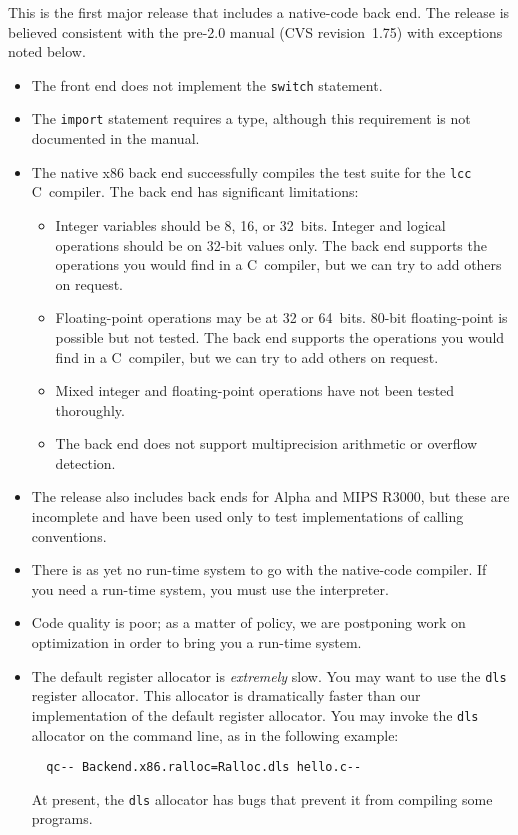 \documentclass{article}
\begin{document}
This is the first major release that includes a native-code back end.
The release is believed consistent with the pre-2.0 manual (CVS
revision~1.75) with exceptions noted below.
\begin{itemize}
\item
The front end does not implement the \texttt{switch} statement.
\item
The \texttt{import} statement requires a type, although this
requirement is not documented in the manual.
\item
The native x86 back end successfully compiles the test suite
for the \texttt{lcc} C~compiler.
The back end has significant limitations:
\begin{itemize}
\item
Integer variables should be 8, 16, or 32~bits.
Integer and logical operations should be on 32-bit values only.
The back end supports the operations you would find in a C~compiler,
but we can try to add others on request.
\item
Floating-point operations may be at 32 or 64~bits.
80-bit floating-point is possible but not tested.
The back end supports the operations you would find in a C~compiler,
but we can try to add others on request.
\item 
Mixed integer and floating-point operations have not been tested
thoroughly. 
\item
The back end does not support multiprecision arithmetic or overflow
detection. 
\end{itemize}
\item
The release also includes back ends for Alpha and MIPS R3000, but these are
incomplete and have been used only to test implementations of calling
conventions. 
\item
There is as yet no run-time system to go with the native-code
compiler.
If you need a run-time system, you must use the interpreter.
\item
 Code quality is poor; as a matter of policy, we are postponing
       work on optimization in order to bring you a run-time system.
\item
The default register allocator is \emph{extremely} slow.
You may want to use the \texttt{dls} register allocator. This
allocator is dramatically faster than our implementation of the
default register allocator. You may invoke the \texttt{dls} allocator on the
command line, as in the following example:
\begin{verbatim} 
  qc-- Backend.x86.ralloc=Ralloc.dls hello.c--
\end{verbatim}
At present, the \texttt{dls} allocator has bugs that prevent it from
compiling some programs.
\end{itemize}
\end{document}
